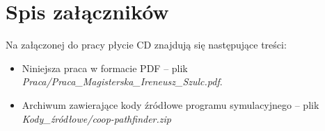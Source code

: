 \chapter*{Spis załączników}

Na załączonej do pracy płycie CD znajdują się następujące treści:
\begin{itemize}
	\item Niniejsza praca w formacie PDF -- plik\\ \textit{Praca/Praca\_Magisterska\_Ireneusz\_Szulc.pdf}.

	\item Archiwum zawierające kody źródłowe programu symulacyjnego -- plik\\ \textit{Kody\_źródłowe/coop-pathfinder.zip}

\end{itemize}
